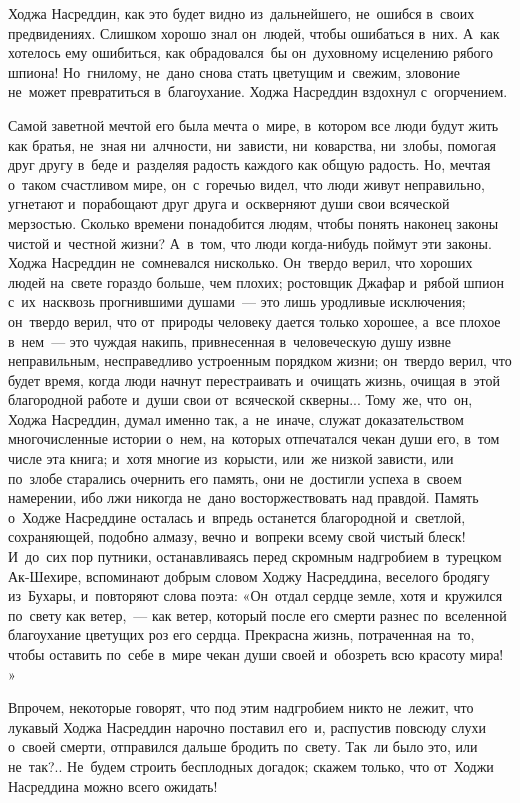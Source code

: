 \documentclass[12pt,a4paper]{book}
\begin{document}
Ходжа Насреддин, как это будет видно из~дальнейшего, не~ошибся в~своих предвидениях. Слишком хорошо знал он~людей, чтобы ошибаться в~них. А~как хотелось ему ошибиться, как обрадовался~бы он~духовному исцелению рябого шпиона! Но~гнилому, не~дано снова стать цветущим и~свежим, зловоние не~может превратиться в~благоухание. Ходжа Насреддин вздохнул с~огорчением.

Самой заветной мечтой его была мечта о~мире, в~котором все люди будут жить как братья, не~зная ни~алчности, ни~зависти, ни~коварства, ни~злобы, помогая друг другу в~беде и~разделяя радость каждого как общую радость. Но, мечтая о~таком счастливом мире, он~с~горечью видел, что люди живут неправильно, угнетают и~порабощают друг друга и~оскверняют души свои всяческой мерзостью. Сколько времени понадобится людям, чтобы понять наконец законы чистой и~честной жизни? А~в~том, что люди когда-нибудь поймут эти законы. Ходжа Насреддин не~сомневался нисколько. Он~твердо верил, что хороших людей на~свете гораздо больше, чем плохих; ростовщик Джафар и~рябой шпион с~их~насквозь прогнившими душами~— это лишь уродливые исключения; он~твердо верил, что от~природы человеку дается только хорошее, а~все плохое в~нем~— это чуждая накипь, привнесенная в~человеческую душу извне неправильным, несправедливо устроенным порядком жизни; он~твердо верил, что будет время, когда люди начнут перестраивать и~очищать жизнь, очищая в~этой благородной работе и~души свои от~всяческой скверны... Тому~же, что~он, Ходжа Насреддин, думал именно так, а~не~иначе, служат доказательством многочисленные истории о~нем, на~которых отпечатался чекан души его, в~том числе эта книга; и~хотя многие из~корысти, или~же низкой зависти, или по~злобе старались очернить его память, они не~достигли успеха в~своем намерении, ибо лжи никогда не~дано восторжествовать над правдой. Память о~Ходже Насреддине осталась и~впредь останется благородной и~светлой, сохраняющей, подобно алмазу, вечно и~вопреки всему свой чистый блеск! И~до~сих пор путники, останавливаясь перед скромным надгробием в~турецком Ак-Шехире, вспоминают добрым словом Ходжу Насреддина, веселого бродягу из~Бухары, и~повторяют слова поэта: «Он~отдал сердце земле, хотя и~кружился по~свету как ветер,~— как ветер, который после его смерти разнес по~вселенной благоухание цветущих роз его сердца. Прекрасна жизнь, потраченная на~то, чтобы оставить по~себе в~мире чекан души своей и~обозреть всю красоту мира! »

Впрочем, некоторые говорят, что под этим надгробием никто не~лежит, что лукавый Ходжа Насреддин нарочно поставил его~и, распустив повсюду слухи о~своей смерти, отправился дальше бродить по~свету. Так~ли было это, или не~так?.. Не~будем строить бесплодных догадок; скажем только, что от~Ходжи Насреддина можно всего ожидать!
\end{document}
